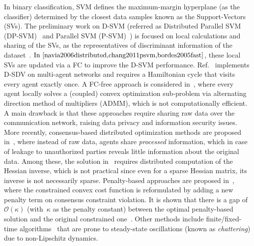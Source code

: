 \documentclass[letterpaper, 10pt, conference]{ieeeconf}
\def\mc{\mathcal}
\begin{document}
In binary classification, SVM defines the maximum-margin hyperplane (as the classifier) determined by the closest data samples known as the Support-Vectors (SVs). The preliminary work on D-SVM (referred as Distributed Parallel SVM (DP-SVM)~\cite{lu2008distributed} and Parallel SVM (P-SVM)~\cite{chang2011psvm}) is focused on local calculations and sharing of the SVs, as the representatives of discriminant information of
the dataset~\cite{navia2006distributed,lu2008distributed,chang2011psvm,bordes2005fast,forero2010consensus}. ${\mbox{In~\cite{navia2006distributed,chang2011psvm,bordes2005fast}}}$, these local SVs are updated via a FC to improve the D-SVM performance. Ref.~\cite{lu2008distributed} implements D-SDV on multi-agent networks and requires a Hamiltonian cycle that visits every agent exactly once. A FC-free approach is considered in~\cite{forero2010consensus}, where every agent locally solves a (coupled) convex optimization sub-problem via alternating direction method of multipliers (ADMM), which is not computationally efficient. A main drawback is that these approaches require sharing raw data over the communication network, raising data privacy and information security issues. More recently, consensus-based distributed optimization methods are proposed in~\cite{gharesifard2013distributed,ning2017distributed,garg2019fixed2,rahili_ren,taes2020finite,li2020time,armand2017globally,srivastava2018distributed,mansoori2019fast}, where instead of raw data, agents share \textit{processed} information, which in case of leakage to unauthorized parties reveals little information about the original data. Among these, the solution in~\cite{armand2017globally} requires distributed computation of the Hessian inverse, which is not practical since even for a sparse Hessian matrix, its inverse is not necessarily sparse. Penalty-based approaches are proposed in~\cite{srivastava2018distributed,mansoori2019fast}, where the constrained convex cost function is reformulated by adding a new penalty term on consensus constraint violation. It is shown that there is a gap of~$\mc{O}(\kappa)$ (with~$\kappa$ as the penalty constant) between the optimal penalty-based solution and the original constrained one~\cite{yuan2016convergence}.
Other methods include finite/fixed-time algorithms~\cite{ning2017distributed,garg2019fixed2,rahili_ren,taes2020finite,li2020time} that are prone to
steady-state oscillations (known as \textit{chattering}) due to non-Lipschitz dynamics. 
\end{document}
